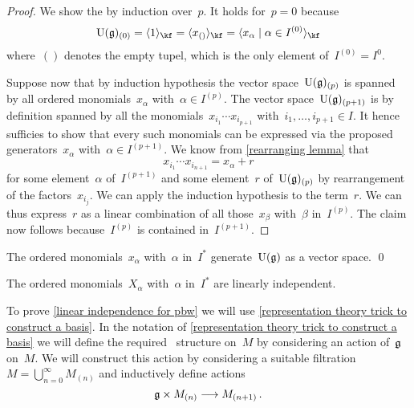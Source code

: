 \begin{proof}
	We show the  by induction over~$p$.
	It holds for~$p = 0$ because
	\[
		\Univ(\glie)_{(0)}
		=
		\gen{ 1 }_{\kf}
		=
		\gen{ x_{()} }_{\kf}
		=
		\gen{ x_\alpha \suchthat \alpha \in I^{(0)} }_{\kf}
	\]
	where~$()$ denotes the empty tupel, which is the only element of~$I^{(0)} = I^{0}$.
	
	Suppose now that by induction hypothesis the vector space~$\operatorname{U}(\mathfrak{g})_{(p)}$ is spanned by all ordered monomials~$x_\alpha$ with~$\alpha \in I^{(p)}$.
	The vector space~$\operatorname{U}(\mathfrak{g})_{(p+1)}$ is by definition spanned by all the monomials~$x_{i_1} \dotsm x_{i_{p+1}}$ with~$i_1, \dotsc, i_{p+1} \in I$.
	It hence sufficies to show that every such monomials can be expressed via the proposed generators~$x_\alpha$ with~$\alpha \in I^{(p+1)}$.
	We know from \cref{rearranging lemma} that
	\[
		x_{i_1} \dotsm x_{i_{n+1}}
		=
		x_\alpha + r
	\]
	for some element~$\alpha$ of~$I^{(p+1)}$ and some element~$r$ of~$\operatorname{U}(\mathfrak{g})_{(p)}$ by rearrangement of the factors~$x_{i_j}$.
	We can apply the induction hypothesis to the term~$r$.
	We can thus express~$r$ as a linear combination of all those~$x_\beta$ with~$\beta$ in~$I^{(p)}$.
	The claim now follows because~$I^{(p)}$ is contained in~$I^{(p+1)}$.
\end{proof}


\begin{corollary}
	\label{generating for pbw}
	The ordered monomials~$x_\alpha$ with~$\alpha$ in~$I^*$ generate~$\Univ(\glie)$ as a vector space.
	\qed
\end{corollary}


\begin{lemma}
	\label{linear independence for pbw}
	The ordered monomials~$X_\alpha$ with~$\alpha$ in~$I^*$ are linearly independent.
\end{lemma}


\begin{fluff}
	To prove \cref{linear independence for pbw} we will use \cref{representation theory trick to construct a basis}.
	In the notation of \cref{representation theory trick to construct a basis} we will define the required~\module{$\Univ(\glie)$} structure on~$M$ by considering an action of~$\mathfrak{g}$ on~$M$.
	We will construct this action by considering a suitable filtration~$M = \bigcup_{n=0}^\infty M_{(n)}$ and inductively define actions
	\[
		\glie \times M_{(n)}
		\to
		M_{(n+1)} \,.
	\]
\end{fluff}


